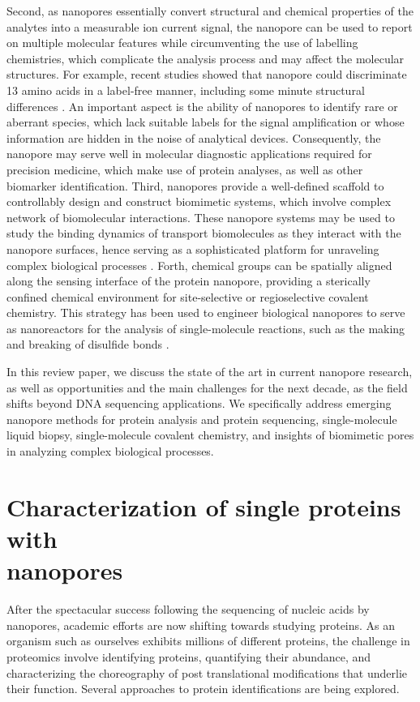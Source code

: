 Second, as nanopores essentially convert structural and chemical properties of the analytes into a measurable ion current signal, the nanopore can be used to report on multiple molecular features while circumventing the use of labelling chemistries, which complicate the analysis process and may affect the molecular structures. For example, recent studies showed that nanopore could discriminate 13 amino acids in a label-free manner, including some minute structural differences \cite{Ouldali2020}. An important aspect is the ability of nanopores to identify rare or aberrant species, which lack suitable labels for the signal amplification or whose information are hidden in the noise of analytical devices. Consequently, the nanopore may serve well in molecular diagnostic applications required for precision medicine, which make use of protein analyses, as well as other biomarker identification. Third, nanopores provide a well-defined scaffold to controllably design and construct biomimetic systems, which involve complex network of biomolecular interactions. These nanopore systems may be used to study the binding dynamics of transport biomolecules as they interact with the nanopore surfaces, hence serving as a sophisticated platform for unraveling complex biological processes \cite{Fragasso2021,Li2021}. Forth, chemical groups can be spatially aligned along the sensing interface of the protein nanopore, providing a sterically confined chemical environment for site-selective or regioselective covalent chemistry. This strategy has been used to engineer biological nanopores to serve as nanoreactors for the analysis of single-molecule reactions, such as the making and breaking of disulfide bonds \cite{Qing2018a,Qing2019}.


In this review paper, we discuss the state of the art in current nanopore research, as well as opportunities and the main challenges for the next decade, as the field shifts beyond DNA sequencing applications. We specifically address emerging nanopore methods for protein analysis and protein sequencing, single-molecule liquid biopsy, single-molecule covalent chemistry, and insights of biomimetic pores in analyzing complex biological processes.



\section[Characterization of single proteins with nanopores]{Characterization of single proteins with \\nanopores}
After the spectacular success following the sequencing of nucleic acids by nanopores, academic efforts are now shifting towards studying proteins. As an organism such as ourselves exhibits millions of different proteins, the challenge in proteomics involve identifying proteins, quantifying their abundance, and characterizing the choreography of post translational modifications that underlie their function. Several approaches to protein identifications are being explored.


